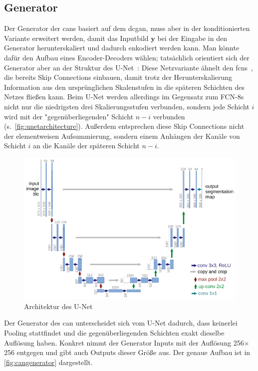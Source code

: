 \subsection{Generator}

Der Generator der \glspl{can} basiert auf dem \gls{dcgan}, muss aber in der konditionierten Variante erweitert werden, damit das Inputbild $ \mathbf{y} $ bei der Eingabe in den Generator herunterskaliert und dadurch enkodiert werden kann.
Man könnte dafür den Aufbau eines Encoder-Decoders wählen; tatsächlich orientiert sich der Generator aber an der Struktur des U-Net~\cite{Ronneberger.2015}:
Diese Netzvariante ähnelt den \glspl{fcn}~\cite{Long.2015}, die bereits Skip Connections einbauen, damit trotz der Herunterskalierung Information aus den ursprünglichen Skalenstufen in die späteren Schichten des Netzes fließen kann.
Beim U-Net werden allerdings im Gegensatz zum FCN-8s nicht nur die niedrigsten drei Skalierungsstufen verbunden, sondern jede Schicht $ i $ wird mit der "gegenüberliegenden" Schicht $ n-i $ verbunden (s.~\autoref{fig:unetarchitecture}).
Außerdem entsprechen diese Skip Connections nicht der elementweisen Aufsummierung, sondern einem Anhängen der Kanäle von Schicht $ i $ an die Kanäle der späteren Schicht $ n-i $.

\begin{figure}[h]
	\centering
	\includegraphics[width=\linewidth]{img/unet_architecture}
	\caption[Architektur des U-Net]{Architektur des U-Net~\cite{Ronneberger.2015}}
	\label{fig:unetarchitecture}
\end{figure}

Der Generator des \gls{can} unterscheidet sich vom U-Net dadurch, dass keinerlei Pooling stattfindet und die gegenüberliegenden Schichten exakt dieselbe Auflösung haben.
Konkret nimmt der Generator Inputs mit der Auflösung 256$\times$256 entgegen und gibt auch Outputs dieser Größe aus.
Der genaue Aufbau ist in \autoref{fig:cangenerator} dargestellt.

